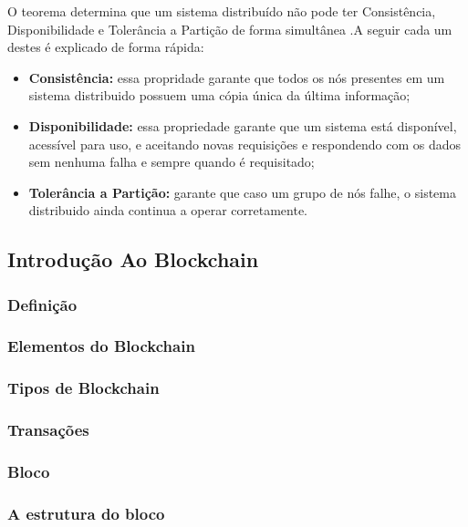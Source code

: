         O teorema determina que um sistema distribuído não pode ter Consistência, Disponibilidade e Tolerância a Partição de forma simultânea \cite{brewer_distributed}.A
        seguir cada um destes é explicado de forma rápida:

        \begin{itemize}
            \item \textbf{Consistência:} essa propridade garante que todos os nós presentes em um sistema distribuido possuem uma cópia única da última informação;
            \item \textbf{Disponibilidade:} essa propriedade garante que um sistema está disponível, acessível para uso, e aceitando novas requisições e respondendo
        com os dados sem nenhuma falha e sempre quando é requisitado;
            \item \textbf{Tolerância a Partição:} garante que caso um grupo de nós falhe, o sistema distribuido ainda continua a operar corretamente.
        \end{itemize}
            

\subsection[]{Introdução Ao Blockchain}

    \subsubsection{Definição}

    \subsubsection{Elementos do Blockchain}

    \subsubsection{Tipos de Blockchain}

    \subsubsection{Transações}

    \subsubsection{Bloco}

        \subsubsection{A estrutura do bloco}

